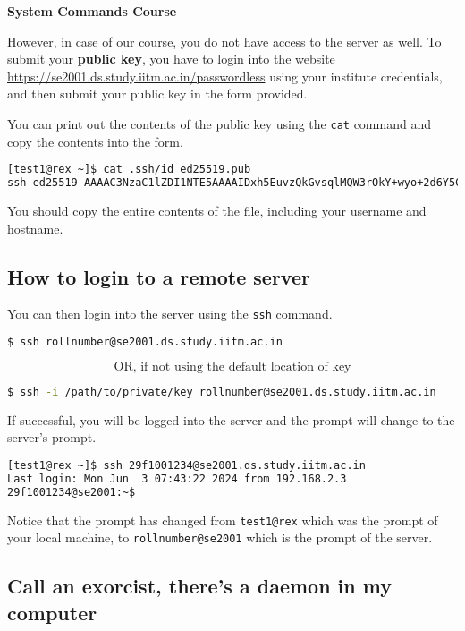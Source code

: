 \textbf{System Commands Course}

However, in case of our course, you do not have access
to the server as well. To submit your \textbf{public key},
you have to login into the website
\url{https://se2001.ds.study.iitm.ac.in/passwordless}
using your institute credentials, and then submit
your public key in the form provided.

You can print out the contents of the public key
using the \texttt{cat} command and copy the contents
into the form.

\begin{lstlisting}[language=bash]
[test1@rex ~]$ cat .ssh/id_ed25519.pub
ssh-ed25519 AAAAC3NzaC1lZDI1NTE5AAAAIDxh5EuvzQkGvsqlMQW3rOkY+wyo+2d6Y5CSqNGlLs2a test1@rex
\end{lstlisting}

You should copy the entire contents of the file, including
your username and hostname.

\subsection{How to login to a remote server}

You can then login into the server using the \texttt{ssh}
command.

\begin{lstlisting}[language=bash]
$ ssh rollnumber@se2001.ds.study.iitm.ac.in
\end{lstlisting}

\[
  \text{OR, if not using the default location of key}
\]

\begin{lstlisting}[language=bash]
$ ssh -i /path/to/private/key rollnumber@se2001.ds.study.iitm.ac.in
\end{lstlisting}

If successful, you will be logged into the server
and the prompt will change to the server's prompt.

\begin{lstlisting}[language=bash]
[test1@rex ~]$ ssh 29f1001234@se2001.ds.study.iitm.ac.in
Last login: Mon Jun  3 07:43:22 2024 from 192.168.2.3
29f1001234@se2001:~$
\end{lstlisting}

Notice that the prompt has changed from \texttt{test1@rex}
which was the prompt of your local machine, to
\texttt{rollnumber@se2001} which is the prompt of the
server.

\subsection{Call an exorcist, there's a daemon in my computer}

